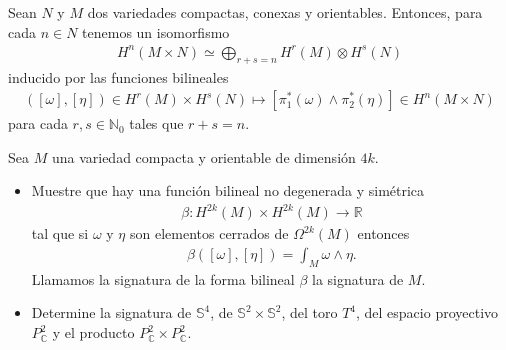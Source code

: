\documentclass[11pt]{article}
\newcommand{\N}{\mathbb{N}}
\newcommand{\R}{\mathbb{R}}
\newcommand{\C}{\mathbb{C}}
\newcommand{\Ss}{\mathbb{S}}
\newcommand{\paint}[1]{\color{color}{#1}}
\newenvironment{theorem}[2][Teorema]{\begin{trivlist}
\item[\hskip \labelsep \paint{{\bfseries #1}}\hskip \labelsep {\bfseries #2.}]}{\end{trivlist}}
\newenvironment{exercise}[2][Ejercicio]{\begin{trivlist}
\item[\hskip \labelsep \paint{{\bfseries #1}}\hskip \labelsep {\bfseries #2.}]}{\end{trivlist}}
\begin{document}
\begin{theorem}{8 (fórmula de Künneth)} Sean $N$ y $M$ dos variedades compactas, conexas y orientables. Entonces, para cada $n \in N$ tenemos un isomorfismo
\begin{align*}
H^n(M \times N) \simeq \bigoplus_{r+s = n}H^r(M) \otimes H^s(N)
\end{align*}
inducido por las funciones bilineales
\begin{align*}
([\omega],[\eta]) \in H^r(M) \times H^s(N) \mapsto [\pi_1^*(\omega) \wedge \pi_2^*(\eta)] \in H^n(M \times N)
\end{align*}
para cada $r,s \in \N_0$ tales que $r+s = n$.
\end{theorem}

\begin{exercise}{6} Sea $M$ una variedad compacta y orientable de dimensión $4k$.
\begin{itemize}[listparindent = \parindent]
\item[(a)] Muestre que hay una función bilineal no degenerada y simétrica
\begin{align*}
\beta : H^{2k}(M) \times H^{2k}(M) \to \R
\end{align*}
tal que si $\omega$ y $\eta$ son elementos cerrados de $\Omega^{2k}(M)$ entonces 
\begin{align*}
\beta([\omega],[\eta]) = \int_M \omega \wedge \eta.
\end{align*}
Llamamos la signatura de la forma bilineal $\beta$ la signatura de $M$.
\item[(b)] Determine la signatura de $\Ss^4$, de $\Ss^2 \times \Ss^2$, del toro $T^4$, del espacio proyectivo $P_{\C}^2$ y el producto $P_{\C}^2 \times P_{\C}^2$.
\end{itemize}
\end{exercise}
\end{document}
